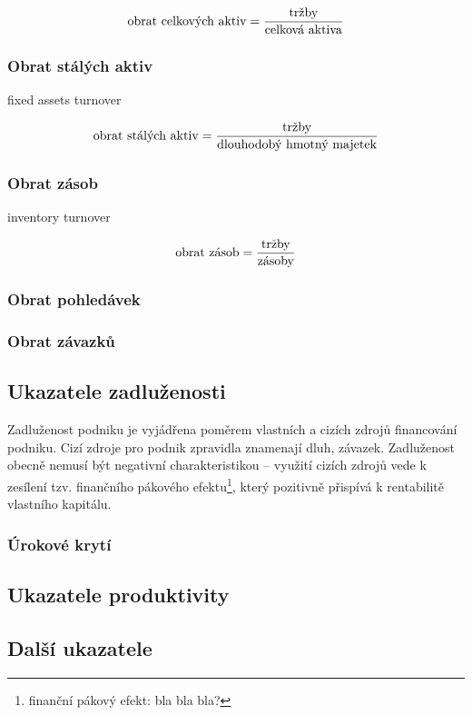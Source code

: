 $$\text{obrat celkových aktiv} = \dfrac{\text{tržby}}{\text{celková aktiva}}$$

\subsubsection{Obrat stálých aktiv}

fixed assets turnover

$$\text{obrat stálých aktiv} = \dfrac{\text{tržby}}{\text{dlouhodobý hmotný majetek}}$$

\subsubsection{Obrat zásob}

inventory turnover

$$\text{obrat zásob} = \dfrac{\text{tržby}}{\text{zásoby}}$$


\subsubsection{Obrat pohledávek}
\subsubsection{Obrat závazků}


\subsection{Ukazatele zadluženosti}
Zadluženost podniku je vyjádřena poměrem vlastních a cizích zdrojů financování podniku. Cizí zdroje pro podnik zpravidla znamenají dluh, závazek. Zadluženost obecně nemusí být negativní charakteristikou -- využití cizích zdrojů vede k zesílení tzv. finančního pákového efektu\footnote{finanční pákový efekt: bla bla bla?}, který pozitivně přispívá k rentabilitě vlastního kapitálu\cite{uk_zadl}.
\subsubsection{Úrokové krytí}

\subsection{Ukazatele produktivity}

\subsection{Další ukazatele}


